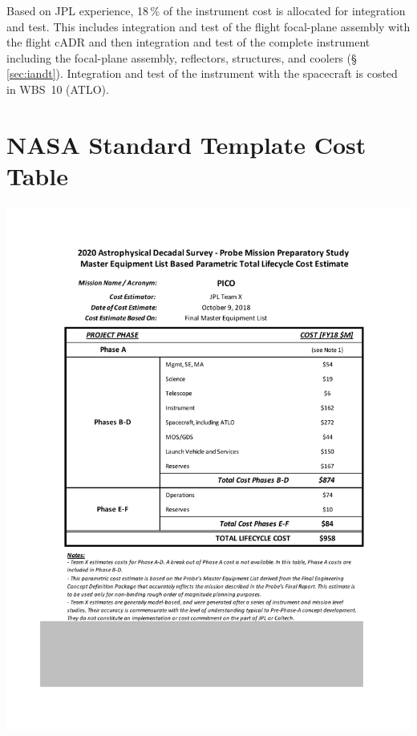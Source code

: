 Based on JPL experience, 18\,\% of the instrument cost is allocated
for integration and test. This includes integration and test of the
flight focal-plane assembly with the flight cADR and then integration
and test of the complete instrument including the focal-plane
assembly, reflectors, structures, and coolers (\S\,\ref{sec:iandt}). Integration and
test of the instrument with the spacecraft is costed in WBS~10
(ATLO).

\newpage


\section*{NASA Standard Template Cost Table}

\begin{centering}
\includegraphics{tables/PICO_Standard_Cost_Table.pdf}
\end{centering}
